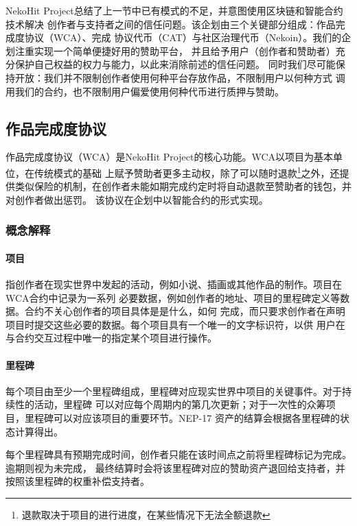 NekoHit Project总结了上一节中已有模式的不足，并意图使用区块链和智能合约技术解决
创作者与支持者之间的信任问题。该企划由三个关键部分组成：作品完成度协议（WCA）、完成
协议代币（CAT）与社区治理代币（Nekoin）。我们的企划注重实现一个简单便捷好用的赞助平台，
并且给予用户（创作者和赞助者）充分保护自己权益的权力与能力，以此来消除前述的信任问题。
同时我们尽可能保持开放：我们并不限制创作者使用何种平台存放作品，不限制用户以何种方式
调用我们的合约，也不限制用户偏爱使用何种代币进行质押与赞助。

\subsection{作品完成度协议}\label{subsec:wca}

作品完成度协议（WCA）是NekoHit Project的核心功能。WCA以项目为基本单位，在传统模式的基础
上赋予赞助者更多主动权，除了可以随时退款\footnote{
    退款取决于项目的进行进度，在某些情况下无法全额退款
}之外，还提供类似保险的机制，在创作者未能如期完成约定时将自动退款至赞助者的钱包，并对创作者做出惩罚。
该协议在企划中以智能合约的形式实现。

\subsubsection{概念解释}

\paragraph{项目}

指创作者在现实世界中发起的活动，例如小说、插画或其他作品的制作。项目在WCA合约中记录为一系列
必要数据，例如创作者的地址、项目的里程碑定义等数据。合约不关心创作者的项目具体是是什么，如何
完成，而只要求创作者在声明项目时提交这些必要的数据。每个项目具有一个唯一的文字标识符，以供
用户在与合约交互过程中唯一的指定某个项目进行操作。

\paragraph{里程碑}

每个项目由至少一个里程碑组成，里程碑对应现实世界中项目的关键事件。对于持续性的活动，里程碑
可以对应每个周期内的第几次更新；对于一次性的众筹项目，里程碑可以对应该项目的重要环节。NEP-17
资产的结算会根据各里程碑的状态计算得出。

每个里程碑具有预期完成时间，创作者只能在该时间点之前将里程碑标记为完成。逾期则视为未完成，
最终结算时会将该里程碑对应的赞助资产退回给支持者，并按照该里程碑的权重补偿支持者。

